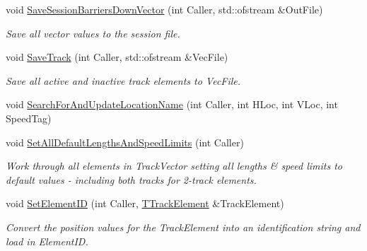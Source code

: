 \begin{DoxyCompactItemize}
\mbox{\label{class_t_track_aabbf9502a68e95e1f9d0b8571d9fb57c}} 
void \mbox{\hyperlink{class_t_track_aabbf9502a68e95e1f9d0b8571d9fb57c}{Save\+Session\+Barriers\+Down\+Vector}} (int Caller, std\+::ofstream \&Out\+File)
\begin{DoxyCompactList}\small\item\em Save all vector values to the session file. \end{DoxyCompactList}\item 
\mbox{\label{class_t_track_a07acf18405f5192f30f5f412c9182d94}} 
void \mbox{\hyperlink{class_t_track_a07acf18405f5192f30f5f412c9182d94}{Save\+Track}} (int Caller, std\+::ofstream \&Vec\+File)
\begin{DoxyCompactList}\small\item\em Save all active and inactive track elements to Vec\+File. \end{DoxyCompactList}\item 
void \mbox{\hyperlink{class_t_track_a68519138e3b39b6ab9433cc9f7862c64}{Search\+For\+And\+Update\+Location\+Name}} (int Caller, int H\+Loc, int V\+Loc, int Speed\+Tag)
\item 
\mbox{\label{class_t_track_ad8d0a63ce71bceab09667aa3623b862d}} 
void \mbox{\hyperlink{class_t_track_ad8d0a63ce71bceab09667aa3623b862d}{Set\+All\+Default\+Lengths\+And\+Speed\+Limits}} (int Caller)
\begin{DoxyCompactList}\small\item\em Work through all elements in Track\+Vector setting all lengths \& speed limits to default values -\/ including both tracks for 2-\/track elements. \end{DoxyCompactList}\item 
\mbox{\label{class_t_track_a31296f2176bd672769e1852ca90ddd51}} 
void \mbox{\hyperlink{class_t_track_a31296f2176bd672769e1852ca90ddd51}{Set\+Element\+ID}} (int Caller, \mbox{\hyperlink{class_t_track_element}{T\+Track\+Element}} \&Track\+Element)
\begin{DoxyCompactList}\small\item\em Convert the position values for the Track\+Element into an identification string and load in Element\+ID. \end{DoxyCompactList}\item 
\mbox{\label{class_t_track_a43c4adf8324c465b90bad0a4dd6761a2}} 

\end{DoxyCompactItemize}
